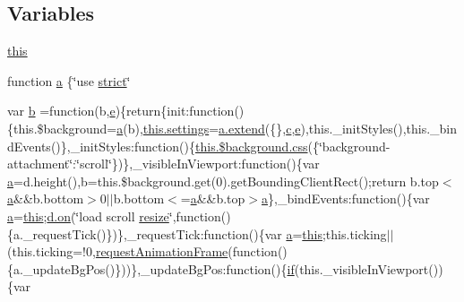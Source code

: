 \subsection*{Variables}
\begin{DoxyCompactItemize}
\item 
\hyperlink{jquery_8parallax-scroll_8min_8js_a05c09a5e9d53fa7adf0a7936038c2fa3}{this}
\item 
function \hyperlink{jquery_8parallax-scroll_8min_8js_aa4d4888597588a84fd5b1184d00c91f3}{a} \{\char`\"{}use \hyperlink{menu_2tpl_2js_2jquery_8jstree_8js_ae2475e10618961c050dcba04e8c42331}{strict}\char`\"{}
\item 
var \hyperlink{jquery_8parallax-scroll_8min_8js_a14e11a60aa3603727bb80abf8f71a4d5}{b} =function(b,\hyperlink{jqplot_8barRenderer_8min_8js_a2ce90ea5f2a400a3a152319491a737ff}{e})\{return\{init\+:function()\{this.\$background=\hyperlink{jqplot_8barRenderer_8min_8js_a15f14caa0c9de3a415d8eb9d88378fc0}{a}(b),\hyperlink{jquery_8oembed_8js_a5f2bfcc7b279913f1db30ff454325585}{this.\+settings}=\hyperlink{ui_8hotkey_8js_a1d042f923681b66da580bedaf1865f22}{a.\+extend}(\{\},\hyperlink{jqplot_8barRenderer_8min_8js_afd00ab025820128970324862a6a2e2ce}{c},\hyperlink{jqplot_8barRenderer_8min_8js_a2ce90ea5f2a400a3a152319491a737ff}{e}),this.\+\_\+init\+Styles(),this.\+\_\+bind\+Events()\},\+\_\+init\+Styles\+:function()\{\hyperlink{layouts_2xedition_2js_2layout_8js_a8536b46dbec2c6e45aa5a64732a07609}{this.\$background.\+css}(\{\char`\"{}background-\/attachment\char`\"{}\+:\char`\"{}scroll\char`\"{}\})\},\+\_\+visible\+In\+Viewport\+:function()\{var \hyperlink{jqplot_8barRenderer_8min_8js_a15f14caa0c9de3a415d8eb9d88378fc0}{a}=d.\+height(),b=this.\$background.\+get(0).get\+Bounding\+Client\+Rect();return b.\+top$<$\hyperlink{jqplot_8barRenderer_8min_8js_a15f14caa0c9de3a415d8eb9d88378fc0}{a}\&\&b.\+bottom$>$0$\vert$$\vert$b.\+bottom$<$=\hyperlink{jqplot_8barRenderer_8min_8js_a15f14caa0c9de3a415d8eb9d88378fc0}{a}\&\&b.\+top$>$\hyperlink{jqplot_8barRenderer_8min_8js_a15f14caa0c9de3a415d8eb9d88378fc0}{a}\},\+\_\+bind\+Events\+:function()\{var \hyperlink{jqplot_8barRenderer_8min_8js_a15f14caa0c9de3a415d8eb9d88378fc0}{a}=\hyperlink{jquery_8parallax-scroll_8min_8js_a05c09a5e9d53fa7adf0a7936038c2fa3}{this};\hyperlink{layouts_2xedition_2js_2layout_8js_aaf79ac162706d5ca930ffba61d467a9f}{d.\+on}(\char`\"{}load scroll \hyperlink{welcome_8min_8js_aa3e541ecd5830235b849b9ed9f715c48}{resize}\char`\"{},function()\{a.\+\_\+request\+Tick()\})\},\+\_\+request\+Tick\+:function()\{var \hyperlink{jqplot_8barRenderer_8min_8js_a15f14caa0c9de3a415d8eb9d88378fc0}{a}=\hyperlink{jquery_8parallax-scroll_8min_8js_a05c09a5e9d53fa7adf0a7936038c2fa3}{this};this.\+ticking$\vert$$\vert$(this.\+ticking=!0,\hyperlink{jquery_8parallax-scroll_8min_8js_a6354438e9c7ce6b4b9dbdd2c9727f4a5}{request\+Animation\+Frame}(function()\{a.\+\_\+update\+Bg\+Pos()\}))\},\+\_\+update\+Bg\+Pos\+:function()\{\hyperlink{menu_2tpl_2js_2jquery_8jstree_8js_acba95bef569cfaee32c4ed0212b2bb92}{if}(this.\+\_\+visible\+In\+Viewport())\{var 
\end{DoxyCompactItemize}

